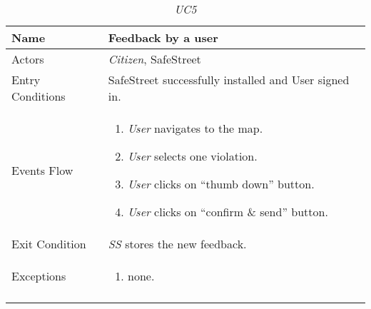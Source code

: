 \documentclass[../../../RASD.tex]{subfiles}
\begin{document}
    \begin{center}
        \begin{longtable}{| p{.35\linewidth} | p{.65\linewidth} |}
            \hline
            \textbf{Name} & \textbf{Feedback by a user}\\ \hline
            Actors & \textit{Citizen}, SafeStreet\\ \hline
            Entry Conditions & SafeStreet successfully installed and User signed in.\\ \hline
            Events Flow &
            \begin{enumerate}
                \item \textit{User} navigates to the map.
                \item \textit{User} selects one violation.
                \item \textit{User} clicks on “thumb down” button.
                \item \textit{User} clicks on “confirm \& send” button.
            \end{enumerate}
            \\ \hline
            Exit Condition & \textit{SS} stores the new feedback.\\ \hline
            Exceptions &
            \begin{enumerate}
                \item none.
            \end{enumerate}
            \\
            \hline
            \caption{\textit{UC5}}
        \end{longtable}
    \end{center}
    \newpage
\end{document}

